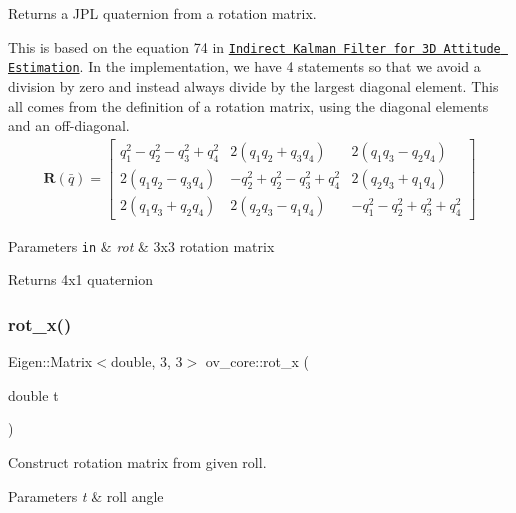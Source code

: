 Returns a J\+PL quaternion from a rotation matrix. 

This is based on the equation 74 in \href{http://mars.cs.umn.edu/tr/reports/Trawny05b.pdf}{\tt Indirect Kalman Filter for 3D Attitude Estimation}. In the implementation, we have 4 statements so that we avoid a division by zero and instead always divide by the largest diagonal element. This all comes from the definition of a rotation matrix, using the diagonal elements and an off-\/diagonal. \begin{align*} \mathbf{R}(\bar{q})= \begin{bmatrix} q_1^2-q_2^2-q_3^2+q_4^2 & 2(q_1q_2+q_3q_4) & 2(q_1q_3-q_2q_4) \\ 2(q_1q_2-q_3q_4) & -q_2^2+q_2^2-q_3^2+q_4^2 & 2(q_2q_3+q_1q_4) \\ 2(q_1q_3+q_2q_4) & 2(q_2q_3-q_1q_4) & -q_1^2-q_2^2+q_3^2+q_4^2 \end{bmatrix} \end{align*}


\begin{DoxyParams}[1]{Parameters}
\mbox{\tt in}  & {\em rot} & 3x3 rotation matrix \\
\hline
\end{DoxyParams}
\begin{DoxyReturn}{Returns}
4x1 quaternion 
\end{DoxyReturn}
\mbox{\label{namespaceov__core_ab3268e0844642c119fe45c2880afb581}} 
\subsubsection{\texorpdfstring{rot\+\_\+x()}{rot\_x()}}
{\footnotesize\ttfamily Eigen\+::\+Matrix$<$double, 3, 3$>$ ov\+\_\+core\+::rot\+\_\+x (\begin{DoxyParamCaption}\item[{double}]{t }\end{DoxyParamCaption})\hspace{0.3cm}{\ttfamily [inline]}}



Construct rotation matrix from given roll. 


\begin{DoxyParams}{Parameters}
{\em t} & roll angle \\
\hline
\end{DoxyParams}
\mbox{\label{namespaceov__core_a2a212d931b6f4325052b3169ad6161a3}} 
